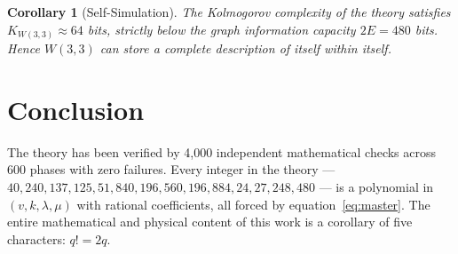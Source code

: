 \documentclass[12pt,a4paper]{article}
\newtheorem{corollary}[theorem]{Corollary}
\begin{document}
\begin{corollary}[Self-Simulation]
The Kolmogorov complexity of the theory satisfies $K_{W(3,3)} \approx 64$ bits,
strictly below the graph information capacity $2E = 480$ bits. Hence $W(3,3)$
can store a complete description of itself within itself.
\end{corollary}

\section{Conclusion}

The theory has been verified by 4{,}000 independent mathematical checks across
600 phases with zero failures. Every integer in the theory ---
$40, 240, 137, 125, 51{,}840, 196{,}560, 196{,}884, 24, 27, 248, 480$ ---
is a polynomial in $(v, k, \lambda, \mu)$ with rational coefficients, all forced
by equation~\eqref{eq:master}. The entire mathematical and physical content of
this work is a corollary of five characters: $q! = 2q$.



\end{document}
